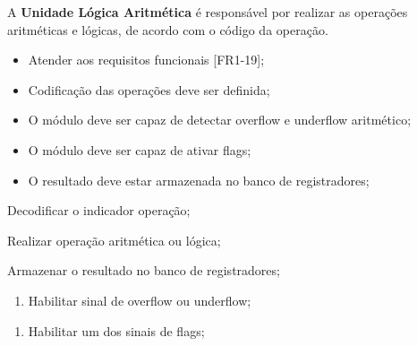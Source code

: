 A \textbf{Unidade Lógica Aritmética} é responsável por realizar as operações aritméticas e lógicas, de acordo com o código da operação.
  
\actors
	\begin{description}
	\end{description}
  
\preconditions 
	\begin{itemize}
	\item Atender aos requisitos funcionais [FR1-19];
	\item Codificação das operações deve ser definida;
	\end{itemize}

\postconditions
    \begin{itemize}
     \item O módulo deve ser capaz de detectar overflow e underflow aritmético;
     \item O módulo deve ser capaz de ativar flags;
     \item O resultado deve estar armazenada no banco de registradores; %
     \end{itemize} 
  
\begin{mainflow}
\item Decodificar o indicador operação;
\item Realizar operação aritmética ou lógica;
\item Armazenar o resultado no banco de registradores;
\end{mainflow}
  
\begin{secondaryflow} 
\begin{enumerate}
\item Habilitar sinal de overflow ou underflow;
\end{enumerate}
\begin{enumerate}
\item Habilitar um dos sinais de flags;
\end{enumerate}
\end{secondaryflow}